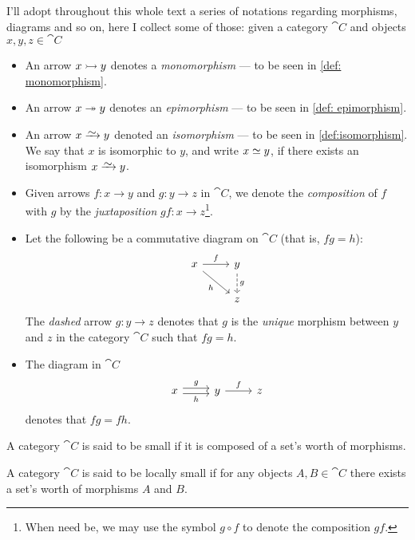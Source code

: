 \begin{notation}
I'll adopt throughout this whole text a series of notations regarding morphisms,
diagrams and so on, here I collect some of those: given a category \(\cat
C\) and objects \(x, y, z \in \cat C\)
\begin{itemize}\setlength\itemsep{0em}
\item An arrow \(x \rightarrowtail y\) denotes a \emph{monomorphism} --- to be seen in
  \cref{def: monomorphism}.
\item An arrow \(x \twoheadrightarrow y\) denotes an \emph{epimorphism} --- to be seen in
  \cref{def: epimorphism}.
\item An arrow \(x \isoto y\) denoted an \emph{isomorphism} --- to be seen in
  \cref{def:isomorphism}. We say that \(x\) is isomorphic to \(y\), and write
  \(x \simeq y\), if there exists an isomorphism \(x \isoto y\).
\item Given arrows \(f: x \to y\) and \(g: y \to z\) in \(\cat C\), we denote
  the \emph{composition} of \(f\) with \(g\) by the \emph{juxtaposition} \(gf: x
  \to z\)\footnote{When need be, we may use the symbol \(g \circ f\) to denote
    the composition \(g f\).}.
\item Let the following be a commutative diagram on \(\cat C\) (that is, \(fg =
  h\)):
  \[
    \begin{tikzcd}
      x \ar[r, "f"] \ar[rd, swap, "h"] &y \ar[d, dashed, "g"] \\ &z
    \end{tikzcd}
  \]
  The \emph{dashed} arrow \(g: y \to z\) denotes that \(g\) is the \emph{unique}
  morphism between \(y\) and \(z\) in the category \(\cat C\) such that \(fg =
  h\).
\item The diagram in \(\cat C\)
  \[
    \begin{tikzcd}
      x \ar[r, shift right, swap, "h"] \ar[r, shift left, "g"]
      &y \ar[r, "f"]
      &z
    \end{tikzcd}
  \]
  denotes that \(f g = f h\).
\end{itemize}
\end{notation}

\begin{definition}[Small]\label{def: small cat}
A category \(\cat C\) is said to be small if it is composed of a set's worth of
morphisms.
\end{definition}

\begin{definition}
A category \(\cat C\) is said to be locally small if for any objects \(A,B \in
\cat C\) there exists a set's worth of morphisms \(A\) and \(B\).
\end{definition}

